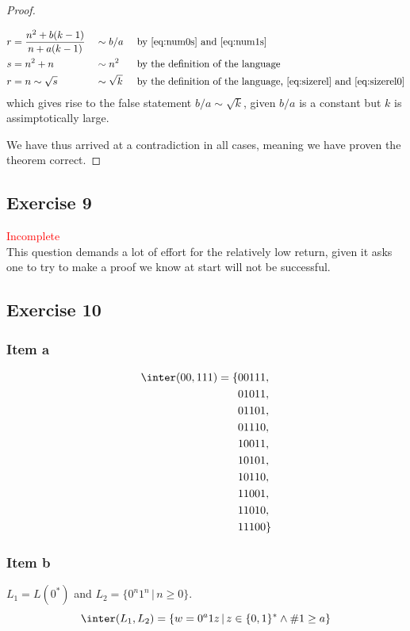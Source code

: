 {\begin{proof}
\begin{itemize}
\begin{alignat}{3}
		r &= \frac{n^2+b(k-1)}{n+a(k-1)} &&\sim b/a      &&\text{ by \eqref{eq:num0s} and \eqref{eq:num1s}} \\
		\label{eq:sizerel} s &= n^2+n    &&\sim n^2      &&\text{ by the definition of the language}\\
		r &= n \sim \sqrt{s}             &&\sim \sqrt{k} &&\text{ by  the definition of the language, \eqref{eq:sizerel} and \eqref{eq:sizerel0}}
	\end{alignat}
	which gives rise to the false statement $b/a \sim \sqrt{k}$, given $b/a$ is a constant but $k$ is assimptotically large.
\end{itemize}
We have thus arrived at a contradiction in all cases, meaning we have proven the theorem correct.
\end{proof}
\subsection{Exercise 9}
\textcolor{red}{Incomplete}\\
This question demands a lot of effort for the relatively low return, given it asks one to try to make a proof we know at start will not be successful.
\subsection{Exercise 10}
\subsubsection{Item a}
\begin{alignat*}{2}
	\inter(00,111)=\{&00111,\\
	&01011,\\
	&01101,\\
	&01110,\\
	&10011,\\
	&10101,\\
	&10110,\\
	&11001,\\
	&11010,\\
	&11100\}
\end{alignat*}
\subsubsection{Item b}
$L_1=L(0^*)$ and $L_2=\{0^n1^n\,|\,n\geq 0\}$.
\begin{equation*}
	\inter(L_1,L_2)=\{w=0^a1z\,|\,z \in \{0,1\}^* \wedge \#1\geq a\}
\end{equation*}
}
